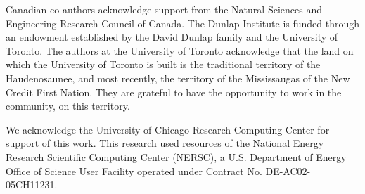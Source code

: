 \documentclass[\docopts]{\docclass}
\begin{document}
Canadian co-authors acknowledge support from the Natural Sciences and Engineering Research Council of Canada.
The Dunlap Institute is funded through an endowment established by the David Dunlap family and the University of Toronto.
The authors at the University of Toronto acknowledge that the land on which the University of Toronto is built is the traditional territory of the Haudenosaunee, and most recently, the territory of the Mississaugas of the New Credit First Nation.
They are grateful to have the opportunity to work in the community, on this territory.

We acknowledge the University of Chicago Research Computing Center for support of this work.
This research used resources of the National Energy Research Scientific Computing Center (NERSC), a U.S. Department of Energy Office of Science User Facility operated under Contract No. DE-AC02-05CH11231.


%
%




\end{document}
